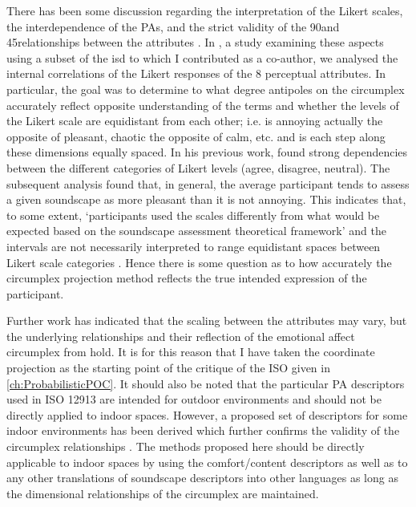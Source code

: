 There has been some discussion regarding the interpretation of the Likert scales, the interdependence of the PAs, and the strict validity of the 90\textdegree and 45\textdegree relationships between the attributes \citep{Lionello2021Thesis, Tarlao2020Investigating}. In \citet{Lionello2021Introducing}, a study examining these aspects using a subset of the \gls{isd} to which I contributed as a co-author, we analysed the internal correlations of the Likert responses of the 8 perceptual attributes. In particular, the goal was to determine to what degree antipoles on the circumplex accurately reflect opposite understanding of the terms and whether the levels of the Likert scale are equidistant from each other; i.e. is annoying actually the opposite of pleasant, chaotic the opposite of calm, etc. and is each step along these dimensions equally spaced. In his previous work, \citet{Lionello2019dimension} found strong dependencies between the different categories of Likert levels (agree, disagree, neutral). The subsequent analysis found that, in general, the average participant tends to assess a given soundscape as more pleasant than it is not annoying. This indicates that, to some extent, `participants used the scales differently from what would be expected based on the soundscape assessment theoretical framework' and the intervals are not necessarily interpreted to range equidistant spaces between Likert scale categories \citep{Lionello2021Introducing}.  Hence there is some question as to how accurately the circumplex projection method reflects the true intended expression of the participant. 

Further work has indicated that the scaling between the attributes may vary, but the underlying relationships and their reflection of the emotional affect circumplex from \citet{Russell1980circumplex} hold. It is for this reason that I have taken the coordinate projection as the starting point of the critique of the ISO given in \cref{ch:ProbabilisticPOC}. It should also be noted that the particular PA descriptors used in ISO 12913 are intended for outdoor environments and should not be directly applied to indoor spaces. However, a proposed set of descriptors for some indoor environments has been derived which further confirms the validity of the circumplex relationships \citep{Torresin2020Indoor}. The  methods proposed here should be directly applicable to indoor spaces by using the comfort/content descriptors as well as to any other translations of soundscape descriptors into other languages \citep{Aletta2020Soundscape} as long as the dimensional relationships of the circumplex are maintained.

